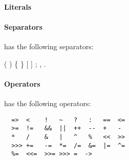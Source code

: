\paragraph{Literals}


\paragraph{Separators}
\Xten{} has the following separators:
\begin{x10}
(	)	\{	\}	[  ]	; ,	.
\end{x10}

\paragraph{Operators}
\Xten{} has the following operators:
{\footnotesize
\begin{verbatim}
  =>  <    !   ~   ?   :   ==  <=  
  >=  !=   &&  ||  ++  --  +   - 
  *   /    &   |   ^   %   <<  >> 
  >>> +=   -=  *=  /=  &=  |=  ^=  
  %=  <<=  >>= >>> =  ->
\end{verbatim}}




